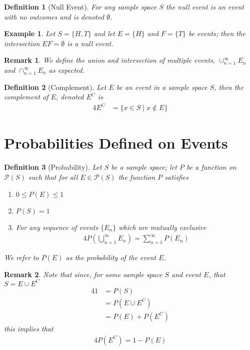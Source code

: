 \documentclass[11pt, oneside]{book}   	%
\newtheorem{definition}{Definition}
\newtheorem{example}{Example}
\newtheorem{remark}{Remark}
\begin{document}
\begin{definition}[Null Event]
	For any sample space $S$ the null event is an event with no outcomes and is denoted $\emptyset$.
\end{definition}

\begin{example}
	Let $S=\{H, T\}$ and let $E=\{H\}$ and $F=\{T\}$ be events; then the intersection $EF=\emptyset$ is a null event. 
\end{example}

\begin{remark}
	We define the union and intersection of multiple events, $\cup_{n=1}^\infty E_n$ and $\cap_{n=1}^\infty E_n$ as expected. 
\end{remark}

\begin{definition}[Complement]
	Let $E$ be an event in a sample space $S$, then the complement of $E$, denoted $E^C$ is 
	\begin{alignat}{4}
		E^C&=\{x\in S\mid x\not\in E\}
	\end{alignat}
\end{definition}

\section{Probabilities Defined on Events}

\begin{definition}[Probability]
	Let $S$ be a sample space; let $P$ be a function on $\mathcal{P}(S)$ such that for all $E\in\mathcal{P}(S)$ the function $P$ satisfies
	\begin{enumerate}
		\item $0\leq P(E)\leq 1$
		\item $P(S)=1$
		\item For any sequence of events $\{E_n\}$ which are mutually exclusive 
			\begin{alignat}{4}
				P\left(\bigcup_{n=1}^\infty E_n\right)=\sum_{n=1}^\infty P(E_n)
			\end{alignat}
	\end{enumerate}
	We refer to $P(E)$ as the probability of the event $E$. 
\end{definition}

\begin{remark}
	Note that since, for some sample space $S$ and event $E$, that $S=E\cup E^C$ 
	\begin{alignat}{4}
		1&=P(S) \\
			&=P\left(E\cup E^C\right) \\
			&=P(E)+P\left(E^C\right)
	\end{alignat}
	this implies that
	\begin{alignat}{4}
		P\left(E^C\right)=1-P(E)
	\end{alignat}
\end{remark}
\end{document}
